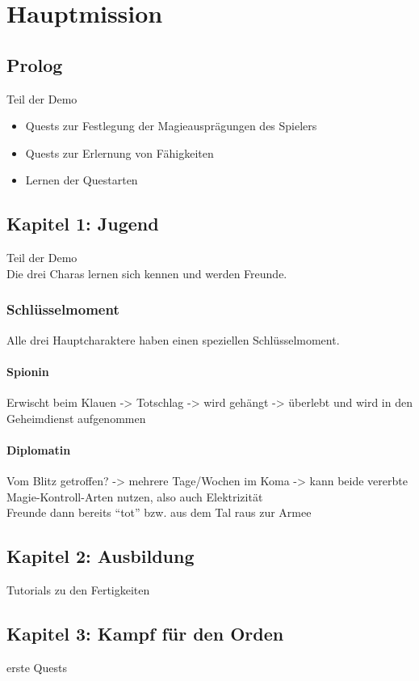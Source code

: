 \chapter{Hauptmission}
\section{Prolog}
Teil der Demo
\begin{itemize}
	\item Quests zur Festlegung der Magieausprägungen des Spielers
	\item Quests zur Erlernung von Fähigkeiten
	\item Lernen der Questarten
\end{itemize}
\section{Kapitel 1: Jugend}
Teil der Demo \\
Die drei Charas lernen sich kennen und werden Freunde.

\subsection{Schlüsselmoment}
Alle drei Hauptcharaktere haben einen speziellen Schlüsselmoment.

\subsubsection{Spionin}
Erwischt beim Klauen -> Totschlag -> wird gehängt -> überlebt und wird in den Geheimdienst aufgenommen

\subsubsection{Diplomatin}
Vom Blitz getroffen? -> mehrere Tage/Wochen im Koma -> kann beide vererbte Magie-Kontroll-Arten nutzen, also auch Elektrizität \\
Freunde dann bereits "`tot"' bzw. aus dem Tal raus zur Armee


\section{Kapitel 2: Ausbildung}
Tutorials zu den Fertigkeiten
\section{Kapitel 3: Kampf für den Orden}
erste Quests

